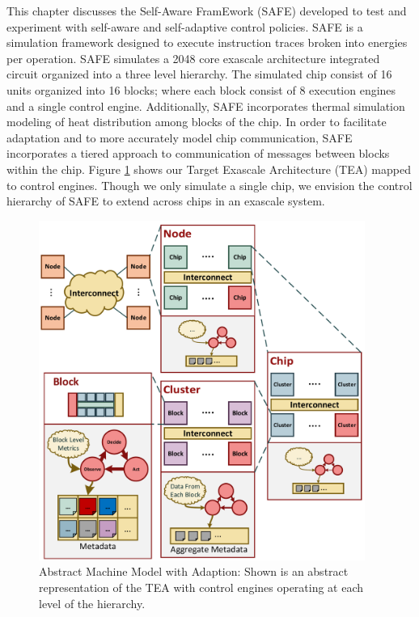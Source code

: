 \label{chap:framework}
This chapter discusses the Self-Aware FramEwork (SAFE) developed to test and experiment with self-aware and self-adaptive control policies. SAFE is a simulation framework designed to execute instruction traces broken into energies per operation. SAFE simulates a 2048 core exascale architecture integrated circuit organized into a three level hierarchy. The simulated chip consist of 16 units organized into 16 blocks; where each block consist of 8 execution engines and a single control engine. Additionally, SAFE incorporates thermal simulation modeling of heat distribution among blocks of the chip. In order to facilitate adaptation and to more accurately model chip communication, SAFE incorporates a tiered approach to communication of messages between blocks within the chip. Figure \ref{fig:AMM} shows our Target Exascale Architecture (TEA) mapped to control engines. Though we only simulate a single chip, we envision the control hierarchy of SAFE to extend across chips in an exascale system.

\begin{figure}[htb!]
    \centering
    \includegraphics[width=0.95\textwidth]{Fig/AMM.pdf}
    \caption[Abstract Machine Model with Adaption]{Abstract Machine Model with Adaption: Shown is an abstract representation of the TEA with control engines operating at each level of the hierarchy.}
    \label{fig:AMM}
\end{figure} 

